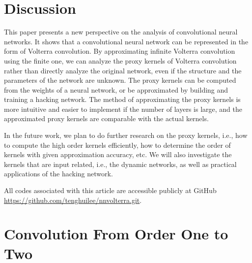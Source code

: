 \documentclass[twoside,11pt]{article}
\begin{document}
\section{Discussion}
\label{sec:discussion}

This paper presents a new perspective on the analysis of convolutional neural networks.
It shows that a convolutional neural network can be represented in the form of Volterra convolution.
By approximating infinite Volterra convolution using the finite one, 
we can analyze the proxy kernels of Volterra convolution rather than directly analyze the original network, even if the structure and the parameters of the network are unknown.
The proxy kernels can be computed from the weights of a neural network, or be approximated by building and training a hacking network. The method of approximating the proxy kernels is more intuitive and easier to implement if the number of layers is large, and the approximated proxy kernels are comparable with the actual kernels.

In the future work, we plan to do further research on the proxy kernels, i.e., how to compute the high order kernels efficiently, how to determine the order of kernels with given approximation accuracy, etc. We will also investigate the kernels that are input related, i.e., the dynamic networks, as well as practical applications of the hacking network.


All codes associated with this article are accessible publicly at GitHub \url{https://github.com/tenghuilee/nnvolterra.git}.



\appendix


\section{Convolution From Order One to Two}
\label{appendix:convolution-from-order-1-to-2}
\end{document}

